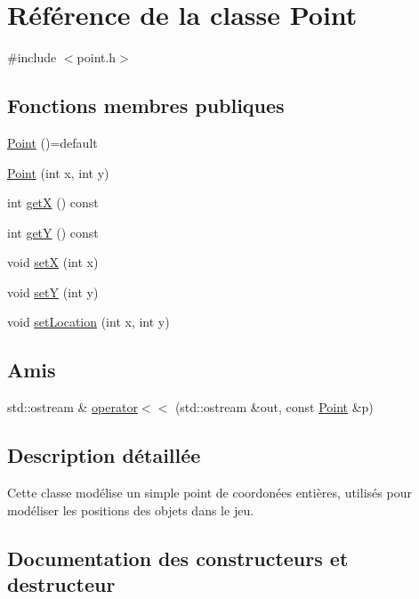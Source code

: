 \hypertarget{class_point}{}\section{Référence de la classe Point}
\label{class_point}


{\ttfamily \#include $<$point.\+h$>$}

\subsection*{Fonctions membres publiques}
\begin{DoxyCompactItemize}
\item 
\mbox{\hyperlink{class_point_a257415ad611a16bb73628efcdb87d0fd}{Point}} ()=default
\item 
\mbox{\hyperlink{class_point_a001c4958c310b248f5c26037aea38a9c}{Point}} (int x, int y)
\item 
int \mbox{\hyperlink{class_point_ac9d5859db121c7d1b89ca89266dca0a3}{getX}} () const
\item 
int \mbox{\hyperlink{class_point_a86d10ff46e08462c45b15a8c7ef62d61}{getY}} () const
\item 
void \mbox{\hyperlink{class_point_acdc86ab607b2ae8415152883e2629015}{setX}} (int x)
\item 
void \mbox{\hyperlink{class_point_afccad787a359f062efc1af5e935a99ba}{setY}} (int y)
\item 
void \mbox{\hyperlink{class_point_ad5250aac5c650853f63942b180f3c8a6}{set\+Location}} (int x, int y)
\end{DoxyCompactItemize}
\subsection*{Amis}
\begin{DoxyCompactItemize}
\item 
std\+::ostream \& \mbox{\hyperlink{class_point_aa818efa680e0d94ce91173ccb4b7aa08}{operator$<$$<$}} (std\+::ostream \&out, const \mbox{\hyperlink{class_point}{Point}} \&p)
\end{DoxyCompactItemize}


\subsection{Description détaillée}
Cette classe modélise un simple point de coordonées entières, utilisés pour modéliser les positions des objets dans le jeu. 

\subsection{Documentation des constructeurs et destructeur}
\mbox{\label{class_point_a257415ad611a16bb73628efcdb87d0fd}} 
